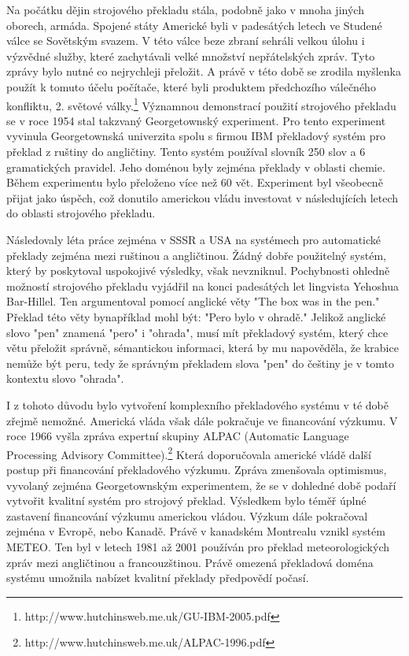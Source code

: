 \documentclass[12pt,a4paper]{report}
\begin{document}
Na počátku dějin strojového překladu stála, podobně jako v mnoha jiných oborech, armáda. Spojené státy Americké byli v padesátých letech ve Studené válce se Sovětským svazem. V této válce beze zbraní sehráli velkou úlohu i výzvědné služby, které zachytávali velké množství nepřátelských zpráv. Tyto zprávy bylo nutné co nejrychleji přeložit. A právě v této době se zrodila myšlenka použít k tomuto účelu počítače, které byli produktem předchozího válečného konfliktu, 2. světové války.\footnote{http://www.hutchinsweb.me.uk/GU-IBM-2005.pdf} Významnou demonstrací použití strojového překladu se v roce 1954 stal takzvaný Georgetownský experiment. Pro tento experiment vyvinula Georgetownská univerzita spolu s firmou IBM překladový systém pro překlad z ruštiny do angličtiny. Tento systém používal slovník 250 slov a 6 gramatických pravidel. Jeho doménou byly zejména překlady v oblasti chemie. Během experimentu bylo přeloženo více než 60 vět. Experiment byl všeobecně přijat jako úspěch, což donutilo americkou vládu investovat v následujících letech do oblasti strojového překladu.

Následovaly léta práce zejména v SSSR a USA na systémech pro automatické překlady zejména mezi ruštinou a angličtinou. Žádný dobře použitelný systém, který by poskytoval uspokojivé výsledky, však nevzniknul. Pochybnosti ohledně možností strojového překladu vyjádřil na konci padesátých let lingvista Yehoshua Bar-Hillel. Ten argumentoval pomocí anglické věty "The box was in the pen." Překlad této věty bynapříklad  mohl být: "Pero bylo v ohradě." Jelikož anglické slovo "pen" znamená "pero" i "ohrada", musí mít překladový systém, který chce větu přeložit správně, sémantickou informaci, která by mu napověděla, že krabice nemůže být peru, tedy že správným překladem slova "pen" do češtiny je v tomto kontextu slovo "ohrada".

I z tohoto důvodu bylo vytvoření komplexního překladového systému v té době zřejmě nemožné. Americká vláda však dále pokračuje ve financování výzkumu. V roce 1966 vyšla zpráva expertní skupiny ALPAC (Automatic Language Processing Advisory Committee).\footnote{http://www.hutchinsweb.me.uk/ALPAC-1996.pdf} Která doporučovala americké vládě další postup při financování překladového výzkumu. Zpráva zmenšovala optimismus, vyvolaný zejména Georgetownským experimentem, že se v dohledné době podaří vytvořit kvalitní systém pro strojový překlad. Výsledkem bylo téměř úplné zastavení financování výzkumu americkou vládou. Výzkum dále pokračoval zejména v Evropě, nebo Kanadě. Právě v kanadském Montrealu vznikl systém METEO. Ten byl v letech 1981 až 2001 používán pro překlad meteorologických zpráv mezi angličtinou a francouzštinou. Právě omezená překladová doména systému umožnila nabízet kvalitní překlady předpovědí počasí.
\end{document}
